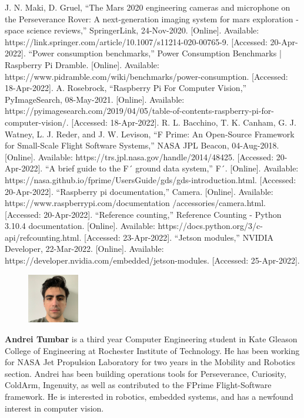 \documentclass{article}
\begin{document}
\begin{thebibliography}{00}
 J. N. Maki, D. Gruel, “The Mars 2020 engineering cameras and microphone on the Perseverance Rover: A next-generation imaging system for mars exploration - space science reviews,” SpringerLink, 24-Nov-2020. [Online]. Available: https://link.springer.com/article/10.1007/s11214-020-00765-9. [Accessed: 20-Apr-2022]. 
 “Power consumption benchmarks,” Power Consumption Benchmarks | Raspberry Pi Dramble. [Online]. Available: https://www.pidramble.com/wiki/benchmarks/power-consumption. [Accessed: 18-Apr-2022].
 A. Rosebrock, “Raspberry Pi For Computer Vision,” PyImageSearch, 08-May-2021. [Online]. Available: https://pyimagesearch.com/2019/04/05/table-of-contents-raspberry-pi-for-computer-vision/. [Accessed: 18-Apr-2022].
 R. L. Bacchino, T. K. Canham, G. J. Watney, L. J. Reder, and J. W. Levison, “F Prime: An Open-Source Framework for Small-Scale Flight Software Systems,” NASA JPL Beacon, 04-Aug-2018. [Online]. Available: https://trs.jpl.nasa.gov/handle/2014/48425. [Accessed: 20-Apr-2022]. 
 “A brief guide to the F´ ground data system,” F´. [Online]. Available: https://nasa.github.io/fprime/UsersGuide/gds/gds-introduction.html. [Accessed: 20-Apr-2022].
 “Raspberry pi documentation,” Camera. [Online]. Available: https://www.raspberrypi.com/documentation
/accessories/camera.html. [Accessed: 20-Apr-2022].
 “Reference counting,” Reference Counting - Python 3.10.4 documentation. [Online]. Available: https://docs.python.org/3/c-api/refcounting.html. [Accessed: 23-Apr-2022].
 “Jetson modules,” NVIDIA Developer, 22-Mar-2022. [Online]. Available: https://developer.nvidia.com/embedded/jetson-modules. [Accessed: 25-Apr-2022]. 
\end{thebibliography}

\setlength{\columnsep}{8pt}
\setlength{\intextsep}{0pt}
\begin{figure}
	\centering
	\includegraphics[width=0.20\textwidth]{author}
\end{figure}
\noindent
\textbf{Andrei Tumbar} is a third year Computer Engineering student in Kate Gleason College of Engineering at Rochester Institute of Technology. He has been working for NASA Jet Propulsion Laboratory for two years in the Mobility and Robotics section. Andrei has been building operations tools for Perseverance, Curiosity, ColdArm, Ingenuity, as well as contributed to the FPrime Flight-Software framework. He is interested in robotics, embedded systems, and has a newfound interest in computer vision.
\end{document}
